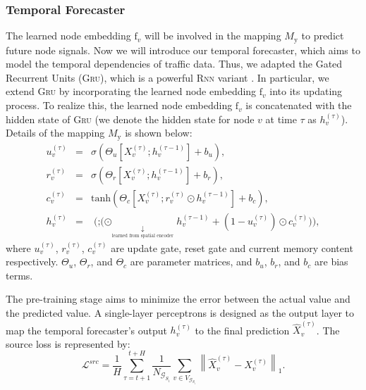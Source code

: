 \documentclass[sigconf]{acmart}
\theoremstyle{definition}
\begin{document}
\subsubsection{Temporal Forecaster}
The learned node embedding $\mathrm{f}_v$ will be involved in the mapping ${M}_{\mathrm{y}}$ to predict future node signals. Now we will introduce our temporal forecaster, which aims to model the temporal dependencies of traffic data. Thus, we adapted the Gated Recurrent Units (\textsc{Gru}), which is a powerful \textsc{Rnn} variant \cite{DBLP:journals/corr/ChungGCB14, fu2016using}. In particular, we extend \textsc{Gru} by incorporating the learned node embedding $\mathrm{f}_v$ into its updating process.
To realize this, the learned node embedding $\mathrm{f}_v$ is concatenated with the hidden state of \textsc{Gru} (we denote the hidden state for node $v$ at time $\tau$ as $h_v^{(\tau)}$). Details of the mapping $M_{\mathrm{y}}$ is shown below: 
\begin{eqnarray}
u_{v}^{(\tau)}&=&\sigma\left(\Theta_{u} \left[{X}^{(\tau)}_{v}; h_{v}^{(\tau-1)}\right]+b_{u}\right),\label{eq6}\\
r_{v}^{(\tau)}&=&\sigma\left(\Theta_{r} \left[{X}^{(\tau)}_{v}; h_{v}^{(\tau-1)}\right]+b_{r}\right),\label{eq7}\\
c_{v}^{(\tau)}&=&\text{tanh}\left(\Theta_{c} \left[{X}^{(\tau)}_{v}; r_{v}^{(\tau)} \odot h_{v}^{(\tau-1)}\right]+b_{c}\right), \label{eq8}\\
h_{v}^{(\tau)}&=&\mathop{\mathrm{MLP^{(\tau)}_{gru}}(\mathrm{f}_{v}  ; (u_{v}^{(\tau)} \odot}_{\underset{\text{learned from spatial encoder}}{\downarrow}} h_{v}^{(\tau-1)}+(1-u_{v}^{(\tau)}) \odot c_{v}^{(\tau)})),\label{eq9}
\end{eqnarray}
where $u_v^{(\tau)}$, $r_v^{(\tau)}$, $c_v^{(\tau)}$ are update gate, reset gate and current memory content respectively. $\Theta_{u}$, $\Theta_{r}$, and $\Theta_{c}$ are parameter matrices, and $b_u$, $b_r$, and $b_c$ are bias terms.

The pre-training stage aims to minimize the error between the actual value and the predicted value. 
A single-layer perceptrons is designed as the output layer to map the temporal forecaster's output $h_v^{(\tau)}$ to the final prediction $\widehat{X}_{v}^{(\tau)}$. The source loss is represented by:
\begin{equation}\label{eq10}
    \mathcal{L}^{src}=\frac{1}{H}\sum_{\tau=t+1}^{t+H}\frac{1}{N_{\mathcal{G}_{S_i}}}\sum_{v \in V_{\mathcal{G}_{S_i}}}\left\|\widehat{X}^{(\tau)}_{v}-X^{(\tau)}_{v}\right\|_{1}.
\end{equation}
\end{document}
